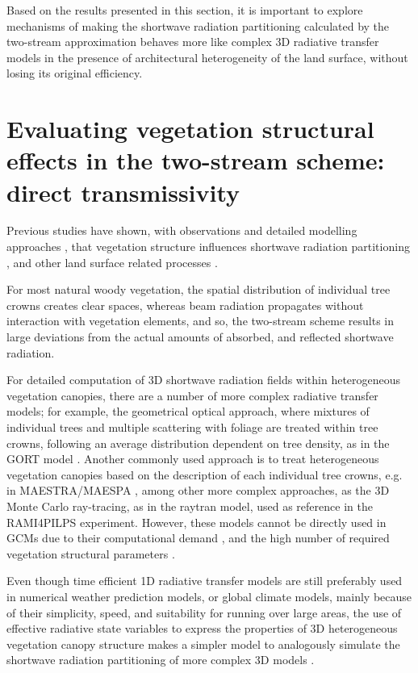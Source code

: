 \documentclass[a4paper,11pt]{report}
\begin{document}
Based on the results presented in this section, it is important to explore mechanisms of making the shortwave radiation partitioning calculated by the two-stream approximation behaves more like complex 3D radiative transfer models in the presence of architectural heterogeneity of the land surface, without losing its original efficiency.

\section{Evaluating vegetation structural effects in the two-stream scheme: direct transmissivity}\label{section:parameterisations}

Previous studies \citep{Nilson1971,Wang1990} have shown, with observations \citep{Kucharik1999,Yang2001,yang2003,Jonckheere2004} and detailed modelling approaches \citep{Ni-Meister2010,Widlowski2011}, that vegetation structure influences shortwave radiation partitioning \citep{pinty2006,Chen2008}, and other land surface related processes \citep{Kobayashi2012,loew2014}.

For most natural woody vegetation, the spatial distribution of individual tree crowns creates clear spaces, whereas beam radiation propagates without interaction with vegetation elements, and so, the two-stream scheme results in large deviations from the actual amounts of absorbed, and reflected shortwave radiation.

For detailed computation of 3D shortwave radiation fields within heterogeneous vegetation canopies, there are a number of more complex radiative transfer models; for example, the geometrical optical approach, where mixtures of individual trees and multiple scattering with foliage are treated within tree crowns, following an average distribution dependent on tree density, as in the GORT model \citep{Li1995}. Another commonly used approach is to treat heterogeneous vegetation canopies based on the description of each individual tree crowns, e.g. in MAESTRA/MAESPA \citep{Wang1990,Duursma2012}, among other more complex approaches, as the 3D Monte Carlo ray-tracing, as in the raytran model, used as reference in the RAMI4PILPS experiment. However, these models cannot be directly used in GCMs due to their computational demand \citep{Yang2001}, and the high number of required vegetation structural parameters \citep{loew2014}. 

Even though time efficient 1D radiative transfer models are still preferably used in numerical weather prediction models, or global climate models, mainly because of their simplicity, speed, and suitability for running over large areas, the use of effective radiative state variables to express the properties of 3D heterogeneous vegetation canopy structure makes a simpler model to analogously simulate the shortwave radiation partitioning of more complex 3D models \citep{Pinty2004,pinty2006}.
\end{document}
